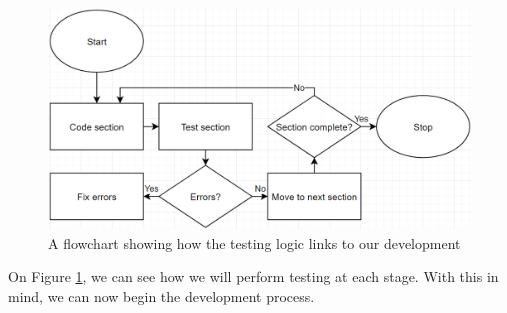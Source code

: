 \documentclass[9pt]{article}
\begin{document}
\begin{figure}[H]
	\centering
	\includegraphics[width=6in]{flowTesting.png}
	\caption{A flowchart showing how the testing logic links to our development}\label{fig_flowTesting}
\end{figure}
On Figure \ref{fig_flowTesting}, we can see how we will perform testing at each stage. With this in mind, we can now begin the development process.











\newpage
\end{document}
